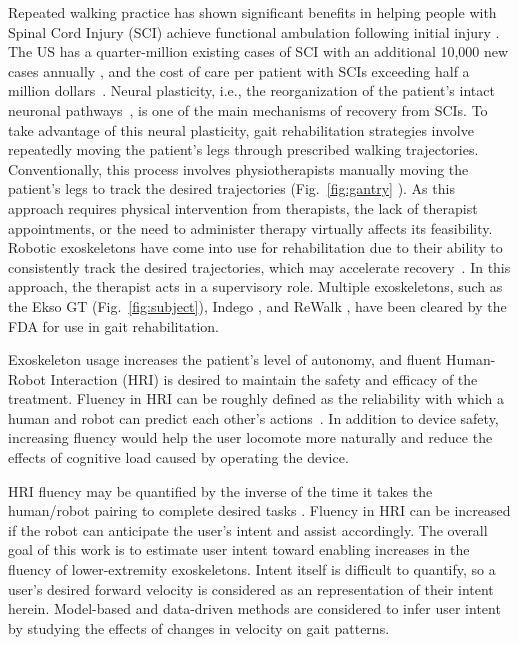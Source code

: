Repeated walking practice has shown significant benefits in helping people with Spinal Cord Injury (SCI) achieve functional ambulation following initial injury \cite{lam2007systematic}. The US has a quarter-million existing cases of SCI with an additional 10,000 new cases annually \cite{nih}, and the cost of care per patient with SCIs exceeding half a million dollars~\cite{devivo2011costs}. Neural plasticity, i.e., the reorganization of the patient's intact neuronal pathways~\cite{curt2008recovery}, is one of the main mechanisms of recovery from SCIs. To take advantage of this neural plasticity, gait rehabilitation strategies involve repeatedly moving the patient's legs through prescribed walking trajectories. Conventionally, this process involves physiotherapists manually moving the patient's legs to track the desired trajectories (Fig.~\ref{fig:gantry} \cite{gaitrehabgantry}). %
As this approach requires physical intervention from therapists, the lack of therapist appointments, or the need to administer therapy virtually affects its feasibility. Robotic exoskeletons have come into use for rehabilitation due to their ability to consistently track the desired trajectories, which may accelerate recovery~\cite{hidler2011role}. In this approach, the therapist acts in a supervisory role. Multiple exoskeletons, such as the Ekso GT \cite{brenner2016exploring} (Fig.~\ref{fig:subject}), Indego \cite{sup2008design}, and ReWalk \cite{rewalk}, have been cleared by the FDA for use in gait rehabilitation.

Exoskeleton usage increases the patient's level of autonomy, and fluent Human-Robot Interaction (HRI) is desired to maintain the safety and efficacy of the treatment. Fluency in HRI can be roughly defined as the reliability with which a human and robot can predict each other's actions~\cite{hoffman2007cost}. In addition to device safety, increasing fluency would help the user locomote more naturally and reduce the effects of cognitive load \cite{bogen2018walk} caused by operating the device.

HRI fluency may be quantified by the inverse of the time it takes the human/robot pairing to complete desired tasks \cite{hoffman2019evaluating}. Fluency in HRI can be increased if the robot can anticipate the user's intent and assist accordingly. The overall goal of this work is to estimate user intent toward enabling increases in the fluency of lower-extremity exoskeletons. Intent itself is difficult to quantify, so a user's desired forward velocity is considered as an representation of their intent herein. Model-based and data-driven methods are considered to infer user intent by studying the effects of changes in velocity on gait patterns.

